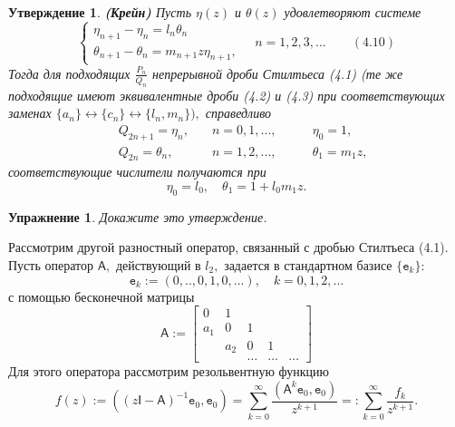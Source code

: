 \documentclass[12 pt, a4 paper]{article}
\theoremstyle{plain}   \newtheorem{Pro}{Задача}
\newtheorem{Sta}{Утверждение}
\newtheorem{Exe}{Упражнение}
\begin{document}
\begin{Sta}
{\bfseries (Крейн)}
Пусть
$ \eta (z) $
и
$ \theta (z) $
удовлетворяют системе
\begin{equation*}
  \begin{cases}
    \eta _{n+1}-\eta _n =l_n \theta _n \\
	\theta _{n+1}-\theta _n =m_{n+1}z\eta_{n+1},
  \end{cases}
  \quad n=1,2,3,... \qquad (4.10)
\end{equation*}
Тогда для подходящих
$ \frac{P_n}{Q_n} $
непрерывной дроби Стилтьеса (4.1)
(те же подходящие имеют эквивалентные дроби (4.2) и (4.3)
при соответствующих заменах
$ \{ a_n \} \leftrightarrow \{ c_n \} \leftrightarrow \{ l_n , m_n \} ), $
справедливо
\begin{align*}
  \; & Q_{2n+1}=\eta _n , \quad & n=0,1,...,
  \quad \quad & \eta _0 =1, \\
  \; & Q_{2n}=\theta _n , \quad & n=1,2,...,
  \quad \quad & \theta _1 =m_1 z ,
\end{align*}
соответствующие числители получаются при
$$
  \eta _0 =l_0 , \quad \theta _1 =1+l_0 m_1 z .
$$
\end{Sta}
\begin{Exe}
Докажите это утверждение.
\end{Exe}
Рассмотрим другой разностный оператор, связанный с дробью
Стилтьеса (4.1). Пусть оператор
$ \mathsf{A} , $
действующий в
$ l_2 , $
задается в стандартном базисе
$ \{ \mathtt{e}_k \} : $
$$
  \mathtt{e}_k := (0,..,0,1,0,...), \quad k=0,1,2,...
$$
с помощью бесконечной матрицы
\begin{equation*}
  \mathsf{A}:=
    \begin{bmatrix}
	  0 & 1 & \; & \; & \; \\
	  a_1 & 0 & 1 & \; & \; \\
	  \; & a_2 & 0 & 1 \\
	  \; & \; & \dots & \dots & \dots
	\end{bmatrix}
\end{equation*}
Для этого оператора рассмотрим резольвентную функцию
\begin{equation*}
  f(z):=((z\mathsf{I}-\mathsf{A})^{-1}\mathtt{e}_0 ,\mathtt{e}_0 )
  =\sum _{k=0}^{\infty}\frac{(\mathsf{A}^k \mathtt{e}_0 ,
  \mathtt{e}_0 )}{z^{k+1}}=: \sum _{k=0}^{\infty}
  \frac{f_k}{z^{k+1}}.
\end{equation*}
\end{document}
